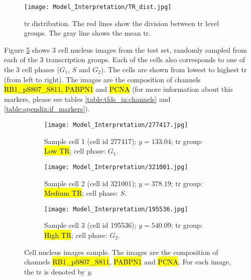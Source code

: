 \begin{figure}[htb]
  \centering
  \texttt{[image: Model\_Interpretation/TR\_dist.jpg]}
  \caption{\gls{tr} distribution. The red lines show the division between \gls{tr} level groups. The gray line shows the mean \gls{tr}.}
  \label{fig:results:model_int:tr_dist}
\end{figure}

Figure \ref{fig:results:model_inter_cell_samp} shows 3 cell nucleus images from the test set, randomly sampled from each of the 3 transcription groups. Each of the cells also corresponds to one of the 3 cell phases ($G_1$, $S$ and $G_2$).
The cells are shown from lowest to highest \gls{tr} (from left to right).
The images are the composition of channels \hl{RB1\_pS807\_S811, PABPN1} and \hl{PCNA} (for more information about this markers, please see tables \ref{table:tfds_in:channels} and \ref{table:apendix:if_markers}).

\begin{figure}[!ht]
  \centering
  \begin{subfigure}[b]{.3\linewidth}
    \texttt{[image: Model\_Interpretation/277417.jpg]}
    \caption{Sample cell 1 (cell id 277417); $y=133.04$; \gls{tr} group: \hl{Low TR}; cell phase: $G_1$.}
    \label{fig:results:model_inter_cell_samp:cell_1}
  \end{subfigure}
  \begin{subfigure}[b]{.3\linewidth}
    \texttt{[image: Model\_Interpretation/321001.jpg]}
    \caption{Sample cell 2 (cell id 321001); $y=378.19$; \gls{tr} group: \hl{Medium TR}; cell phase: $S$.}
    \label{fig:results:model_inter_cell_samp:cell_2}
  \end{subfigure}
  \begin{subfigure}[b]{.3\linewidth}
    \texttt{[image: Model\_Interpretation/195536.jpg]}
    \caption{Sample cell 3 (cell id 195536); $y=540.09$; \gls{tr} group: \hl{High TR}; cell phase: $G_2$.}
    \label{fig:results:model_inter_cell_samp:cell_3}
  \end{subfigure}
  \caption{Cell nucleus images sample. The images are the composition of channels \hl{RB1\_pS807\_S811}, \hl{PABPN1} and \hl{PCNA}. For each image, the \gls{tr} is denoted by $y$.}
  \label{fig:results:model_inter_cell_samp}
\end{figure}
